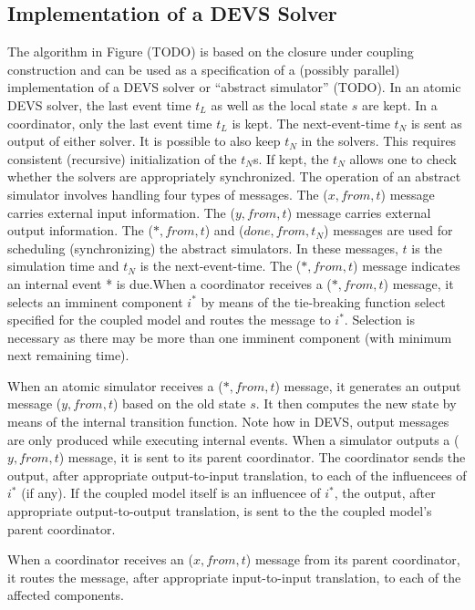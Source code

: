 \subsection{Implementation of a DEVS Solver}
The algorithm in Figure (TODO) is based on the closure under coupling construction and can be used as a specification of a 
(possibly parallel) implementation of a DEVS solver or “abstract simulator” (TODO). In an atomic DEVS solver, the last event 
time $t_L$ as well as the local state $s$ are kept. In a coordinator, only the last event time $t_L$ is kept. The 
next-event-time $t_N$ is sent as output of either solver. It is possible to also keep $t_N$ in the solvers. This requires 
consistent (recursive) initialization of the $t_N$s. If kept, the $t_N$ allows one to check whether the solvers are 
appropriately synchronized. The operation of an abstract simulator involves handling four types of messages. The ($x, from, t$)
message carries external input information. The ($y, from, t$) message carries external output information. The ($*, from, t$) 
and ($done, from, t_N$) messages are used for scheduling (synchronizing) the abstract simulators. In these messages, $t$ is the 
simulation time and $t_N$ is the next-event-time. The ($*, from, t$) message indicates an internal event * is due.When a 
coordinator receives a ($*, from, t$) message, it selects an imminent component $i^*$ by means of the tie-breaking function 
select specified for the coupled model and routes the message to $i^*$. Selection is necessary as there may be more than one 
imminent component (with minimum next remaining time).

When an atomic simulator receives a ($*, from, t$) message, it generates an output message ($y, from, t$) based on the old state 
$s$. It then computes the new state by means of the internal transition function. Note how in DEVS, output messages are only 
produced while executing internal events. When a simulator outputs a ($y, from, t$) message, it is sent to its parent coordinator. 
The coordinator sends the output, after appropriate output-to-input translation, to each of the influencees of $i^*$ (if any). If 
the coupled model itself is an influencee of $i^*$, the output, after appropriate output-to-output translation, is sent to the the 
coupled model's parent coordinator.


When a coordinator receives an ($x, from, t$) message from its parent coordinator, it routes the message, after appropriate 
input-to-input translation, to each of the affected components.

